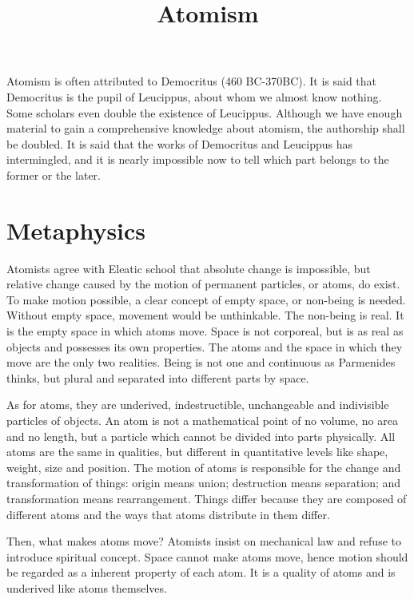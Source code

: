 \documentclass[11pt]{article}
\title{Atomism}
\date{}
\begin{document}
\begin{sloppypar}
  \maketitle

  \linenumbers
Atomism is often attributed to Democritus (460 BC-370BC). 
It is said that Democritus is the pupil of Leucippus, about whom we almost know nothing. 
Some scholars even double the existence of Leucippus. 
Although we have enough material to gain a comprehensive knowledge about atomism, the authorship shall be doubled. 
It is said that the works of Democritus and Leucippus has intermingled, and it is nearly impossible now to tell which part belongs to the former or the later.

\section{Metaphysics} 
Atomists agree with Eleatic school that absolute change is impossible, but relative change caused by the motion of permanent particles, or atoms, do exist. 
To make motion possible, a clear concept of empty space, or non-being is needed. 
Without empty space, movement would be unthinkable. 
The non-being is real. 
It is the empty space in which atoms move. 
Space is not corporeal, but is as real as objects and possesses its own properties. 
The atoms and the space in which they move are the only two realities. 
Being is not one and continuous as Parmenides thinks, but plural and separated into different parts by space. 

\par

As for atoms, they are underived, indestructible, unchangeable and indivisible particles of objects. 
An atom is not a mathematical point of no volume, no area and no length, but a particle which cannot be divided into parts physically. 
All atoms are the same in qualities, but different in quantitative levels like shape, weight, size and position. 
The motion of atoms is responsible for the change and transformation of things: 
origin means union; 
destruction means separation; 
and transformation means rearrangement. 
Things differ because they are composed of different atoms and the ways that atoms distribute in them differ.

\par

Then, what makes atoms move? 
Atomists insist on mechanical law and refuse to introduce spiritual concept. 
Space cannot make atoms move, hence motion should be regarded as a inherent property of each atom. 
It is a quality of atoms and is underived like atoms themselves.
  

\end{sloppypar}
\end{document}

